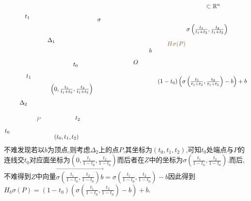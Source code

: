 \documentclass{article}
\begin{document}
\[\begin{tikzpicture}[x=0.75pt,y=0.75pt,yscale=-1,xscale=1]
    \draw (199,78.82) node [anchor=north west][inner sep=0.75pt]    {$\Delta _{1}$};
    \draw (256.24,133.79) node [anchor=north west][inner sep=0.75pt]    {$t_{0}$};
    \draw (149,26.68) node [anchor=north west][inner sep=0.75pt]    {$t_{1}$};
    \draw (137,217.82) node [anchor=north west][inner sep=0.75pt]    {$\Delta _{2}$};
    \draw (152,159.68) node [anchor=north west][inner sep=0.75pt]    {$t_{1}$};
    \draw (104.24,281.79) node [anchor=north west][inner sep=0.75pt]    {$t_{0}$};
    \draw (261,253.05) node [anchor=north west][inner sep=0.75pt]    {$t_{2}$};
    \draw (390,128.4) node [anchor=north west][inner sep=0.75pt]    {$O$};
    \draw (552,3.4) node [anchor=north west][inner sep=0.75pt]    {$\subset \mathbb{R}^{n}$};
    \draw (214,293.4) node [anchor=north west][inner sep=0.75pt]    {$( t_{0} ,t_{1} ,t_{2})$};
    \draw (206,181.4) node [anchor=north west][inner sep=0.75pt]    {$\left( 0,\frac{t_{1}}{t_{1} +t_{2}} ,\frac{t_{2}}{t_{1} +t_{2}}\right)$};
    \draw (310,36.4) node [anchor=north west][inner sep=0.75pt]    {$\sigma $};
    \draw (508,48.4) node [anchor=north west][inner sep=0.75pt]    {$\sigma \left(\frac{t_{1}}{t_{1} +t_{2}} ,\frac{t_{2}}{t_{1} +t_{2}}\right)$};
    \draw (444,164.4) node [anchor=north west][inner sep=0.75pt]    {$( 1-t_{0})\left( \sigma \left(\frac{t_{1}}{t_{1} +t_{2}} ,\frac{t_{2}}{t_{1} +t_{2}}\right) -b\right) +b$};
    \draw (425,102.4) node [anchor=north west][inner sep=0.75pt]    {$b$};
    \draw (174,255.4) node [anchor=north west][inner sep=0.75pt]  [color={rgb, 255:red, 139; green, 87; blue, 42 }  ,opacity=1 ]  {$P$};
    \draw (465,86.4) node [anchor=north west][inner sep=0.75pt]  [color={rgb, 255:red, 139; green, 87; blue, 42 }  ,opacity=1 ]  {$H\sigma ( P)$};
    
    
    \end{tikzpicture}\]
    不难发现若以$b$为顶点,则考虑$\Delta_2$上的点$P$,其坐标为$(t_0,t_1,t_2)$,可知$t_0$处端点与$P$的连线交$t_0$对应面坐标为$\left(0,\frac{t_1}{1-t_0},\frac{t_2}{1-t_0}\right)$而后者在$Z$中的坐标为$\sigma\left(\frac{t_1}{1-t_0},\frac{t_2}{1-t_0}\right)$.而后,不难得到$Z$中向量$\overrightarrow{\sigma\left(\frac{t_1}{1-t_0},\frac{t_2}{1-t_0}\right) b} = \sigma\left(\frac{t_1}{1-t_0},\frac{t_2}{1-t_0}\right)-b$因此得到$H_b\sigma(P) = (1-t_0)\left(\sigma\left(\frac{t_1}{1-t_0},\frac{t_2}{1-t_0}\right)-b\right)+b$.\\
\end{document}
